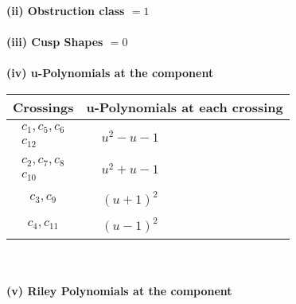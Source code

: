 \documentclass[1p]{elsarticle_modified}
\theoremstyle{definition}
\begin{document}
\flushleft \textbf{(ii) Obstruction class $= 1$}\\~\\
\flushleft \textbf{(iii) Cusp Shapes $= 0$}\\~\\
\newpage\renewcommand{\arraystretch}{1}
\flushleft \textbf{(iv) u-Polynomials at the component}\newline \\
\begin{tabular}{m{50pt}|m{274pt}}
Crossings & \hspace{64pt}u-Polynomials at each crossing \\
\hline $$\begin{aligned}c_{1},c_{5},c_{6}\\c_{12}\end{aligned}$$&$\begin{aligned}
&u^2- u-1
\end{aligned}$\\
\hline $$\begin{aligned}c_{2},c_{7},c_{8}\\c_{10}\end{aligned}$$&$\begin{aligned}
&u^2+u-1
\end{aligned}$\\
\hline $$\begin{aligned}c_{3},c_{9}\end{aligned}$$&$\begin{aligned}
&(u+1)^2
\end{aligned}$\\
\hline $$\begin{aligned}c_{4},c_{11}\end{aligned}$$&$\begin{aligned}
&(u-1)^2
\end{aligned}$\\
\hline
\end{tabular}\\~\\
\newpage\renewcommand{\arraystretch}{1}
\flushleft \textbf{(v) Riley Polynomials at the component}\newline \\
\end{document}
